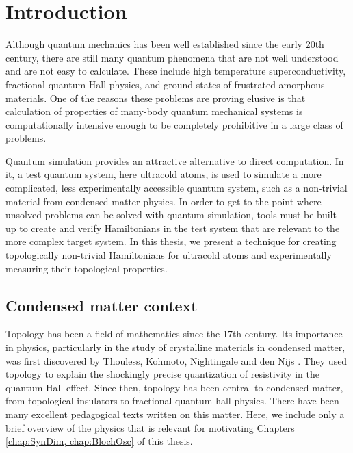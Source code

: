 \renewcommand{\thechapter}{1}

\chapter{Introduction}\label{chap:Chern}
Although quantum mechanics has been well established since the early 20th century, there are still many quantum phenomena that are not well understood and are not easy to calculate. These include high temperature superconductivity\cite{Dagotto1994,Lee2006}, fractional quantum Hall physics\cite{Stormer1999,Murthy2003}, and ground states of frustrated amorphous materials\cite{Berthier2011}. One of the reasons these problems are proving elusive is that calculation of properties of many-body quantum mechanical systems is computationally intensive enough to be completely prohibitive in a large class of problems. 

Quantum simulation provides an attractive alternative to direct computation. In it, a test quantum system, here ultracold atoms, is used to simulate a more complicated, less experimentally accessible quantum system, such as a non-trivial material from condensed matter physics. In order to get to the point where unsolved problems can be solved with quantum simulation, tools must be built up to create and verify Hamiltonians in the test system that are relevant to the more complex target system. In this thesis, we present a technique for creating topologically non-trivial Hamiltonians for ultracold atoms and experimentally measuring their topological properties.

\section{Condensed matter context}
Topology has been a field of mathematics since the 17th century. Its importance in physics, particularly in the study of crystalline materials in condensed matter, was first discovered by Thouless, Kohmoto, Nightingale and den Nijs \cite{Thouless1982}. They used topology to explain the shockingly precise quantization of resistivity in the quantum Hall effect. Since then, topology has been central to condensed matter, from topological insulators\cite{Qi2011} to fractional quantum hall physics\cite{Stormer1999}. There have been many excellent pedagogical texts written on this matter. Here, we include only a brief overview of the physics that is relevant for motivating Chapters \ref{chap:SynDim, chap:BlochOsc} of this thesis.  

